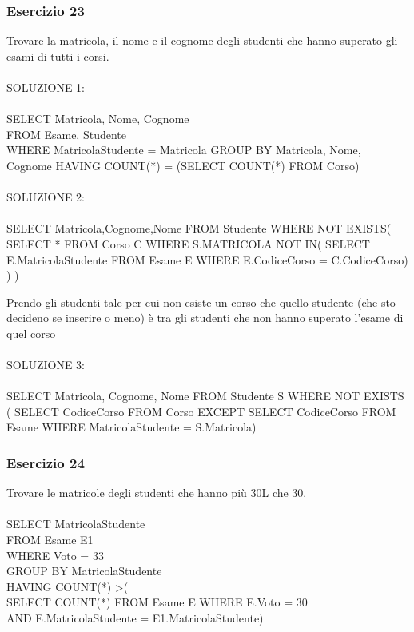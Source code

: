 \documentclass{article}
\begin{document}
\subsubsection{Esercizio 23}
Trovare la matricola, il nome e il cognome degli studenti che hanno superato gli esami di tutti i corsi.\\
\\
SOLUZIONE 1:\\
\\
SELECT Matricola, Nome, Cognome\\
FROM Esame, Studente\\
WHERE MatricolaStudente = Matricola
GROUP BY Matricola, Nome, Cognome
HAVING COUNT(*) = (SELECT COUNT(*) FROM Corso)\\
\\
SOLUZIONE 2:\\
\\
SELECT Matricola,Cognome,Nome
FROM Studente
WHERE NOT EXISTS(
    SELECT * FROM Corso C
    WHERE S.MATRICOLA NOT IN(
        SELECT E.MatricolaStudente
        FROM Esame E
        WHERE E.CodiceCorso = C.CodiceCorso)
    )
)

Prendo gli studenti tale per cui non esiste un corso che quello studente (che sto decideno se inserire o meno) è tra gli studenti che non hanno superato l'esame di quel corso\\
\\
SOLUZIONE 3:\\
\\
SELECT Matricola, Cognome, Nome
FROM Studente S
WHERE NOT EXISTS (
    SELECT CodiceCorso
    FROM Corso
    EXCEPT
    SELECT CodiceCorso
    FROM Esame
    WHERE MatricolaStudente = S.Matricola)

\subsubsection{Esercizio 24}
Trovare le matricole degli studenti che hanno più 30L che 30.\\
\\
SELECT MatricolaStudente\\
FROM Esame E1\\
WHERE Voto = 33\\
GROUP BY MatricolaStudente\\
HAVING COUNT(*) >(\\
    SELECT COUNT(*)
    FROM Esame E
    WHERE E.Voto = 30\\
    AND E.MatricolaStudente = E1.MatricolaStudente)
    
\end{document}
